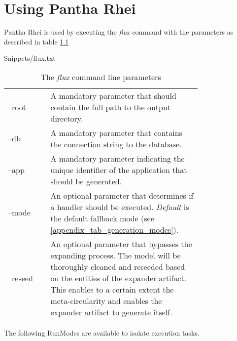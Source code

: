 \chapter{Using Pantha Rhei} \label{appendix_run_flux}

Pantha Rhei is used by executing the \emph{flux} command with the parameters as described
in table \ref{appendix_tab_commandline_parameters}


    {Snippets/flux.txt}

\begin{table}[H]
    \begin{tabular}{ l | p{0.78\linewidth}}
        \toprule
        --root & A mandatory parameter that should contain the full path to the output
        directory. \\
        --db & A mandatory parameter that contains the connection string to the database. \\
        --app & A mandatory parameter indicating the unique identifier of the application that should be generated. \\
        --mode & An optional parameter that determines if a handler should be executed.
        \emph{Default} is the default fallback mode (see \ref{appendix_tab_generation_modes}). \\
        --reseed & An optional parameter that bypasses the expanding process. The model will
        be thoroughly cleaned and reseeded based on the entities of the expander
        artifact. This enables to a certain extent the meta-circularity and enables the
        expander artifact to generate itself. \\
        \bottomrule
    \end{tabular}
    \caption{The \emph{flux} command line parameters}
    \label{appendix_tab_commandline_parameters}
\end{table}



The following RunModes are available to isolate execution tasks.

